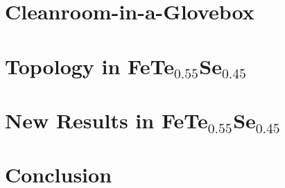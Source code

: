 \documentclass[reqno,12pt,oneside]{report} %
\begin{document}
\chapter{Cleanroom-in-a-Glovebox}
\label{chap:chap2}
 
 
\chapter{Topology in FeTe\texorpdfstring{$_{0.55}$}{0.55}Se\texorpdfstring{$_{0.45}$}{0.45}}
\label{chap:CRAIG}

 
\chapter{New Results in FeTe\texorpdfstring{$_{0.55}$}{0.55}Se\texorpdfstring{$_{0.45}$}{0.45}}
\label{chap:PAR}

 
\chapter{Conclusion}
\label{chap:conclusion}


\startappendices
{}
\label{app:ARfit}

 
\label{app:Circuit}


\startbibliography
\begin{singlespace}
    \printbibliography[heading = none]
\end{singlespace}
\end{document}
